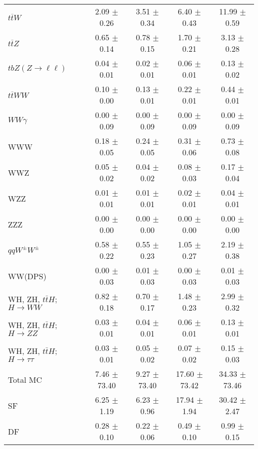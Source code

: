 \begin{tabular}{l|cccc}
                   $t\overline{t}W$ &  2.09 $\pm$  0.26 &  3.51 $\pm$  0.34 &  6.40 $\pm$  0.43 & 11.99 $\pm$  0.59 \\
                   $t\overline{t}Z$ &  0.65 $\pm$  0.14 &  0.78 $\pm$  0.15 &  1.70 $\pm$  0.21 &  3.13 $\pm$  0.28 \\
    $tbZ (Z \rightarrow \ell \ell)$ &  0.04 $\pm$  0.01 &  0.02 $\pm$  0.01 &  0.06 $\pm$  0.01 &  0.13 $\pm$  0.02 \\
                  $t\overline{t}WW$ &  0.10 $\pm$  0.00 &  0.13 $\pm$  0.01 &  0.22 $\pm$  0.01 &  0.44 $\pm$  0.01 \\
                         $WW\gamma$ &  0.00 $\pm$  0.09 &  0.00 $\pm$  0.09 &  0.00 $\pm$  0.09 &  0.00 $\pm$  0.09 \\
                                WWW &  0.18 $\pm$  0.05 &  0.24 $\pm$  0.05 &  0.31 $\pm$  0.06 &  0.73 $\pm$  0.08 \\
                                WWZ &  0.05 $\pm$  0.02 &  0.04 $\pm$  0.02 &  0.08 $\pm$  0.03 &  0.17 $\pm$  0.04 \\
                                WZZ &  0.01 $\pm$  0.01 &  0.01 $\pm$  0.01 &  0.02 $\pm$  0.01 &  0.04 $\pm$  0.01 \\
                                ZZZ &  0.00 $\pm$  0.00 &  0.00 $\pm$  0.00 &  0.00 $\pm$  0.00 &  0.00 $\pm$  0.00 \\
                 $qqW^{\pm}W^{\pm}$ &  0.58 $\pm$  0.22 &  0.55 $\pm$  0.23 &  1.05 $\pm$  0.27 &  2.19 $\pm$  0.38 \\
                            WW(DPS) &  0.00 $\pm$  0.03 &  0.01 $\pm$  0.03 &  0.00 $\pm$  0.03 &  0.01 $\pm$  0.03 \\
WH, ZH, $t\bar{t}H$; $H \rightarrow WW$ &  0.82 $\pm$  0.18 &  0.70 $\pm$  0.17 &  1.48 $\pm$  0.23 &  2.99 $\pm$  0.32 \\
WH, ZH, $t\bar{t}H$; $H \rightarrow ZZ$ &  0.03 $\pm$  0.01 &  0.04 $\pm$  0.01 &  0.06 $\pm$  0.01 &  0.13 $\pm$  0.01 \\
WH, ZH, $t\bar{t}H$; $H \rightarrow \tau\tau$ &  0.03 $\pm$  0.01 &  0.05 $\pm$  0.02 &  0.07 $\pm$  0.02 &  0.15 $\pm$  0.03 \\
\hline\hline
                           Total MC &  7.46 $\pm$ 73.40 &  9.27 $\pm$ 73.40 & 17.60 $\pm$ 73.42 & 34.33 $\pm$ 73.46 \\
\hline
                                 SF &  6.25 $\pm$  1.19 &  6.23 $\pm$  0.96 & 17.94 $\pm$  1.94 & 30.42 $\pm$  2.47 \\
                                 DF &  0.28 $\pm$  0.10 &  0.22 $\pm$  0.06 &  0.49 $\pm$  0.10 &  0.99 $\pm$  0.15 \\

\end{tabular}

